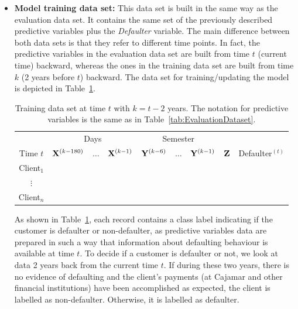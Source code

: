 \begin{itemize}
\item \textbf{Model training data set:}  This data set is built in the same way as the evaluation data set. It contains the same set of the previously described predictive variables plus the \textit{Defaulter} variable. The main difference between both data sets is that they refer to different time points. In fact, the predictive variables in the evaluation data set are built from time $t$ (current time) backward, whereas the ones in the training data set are built from time $k$ (2 years before $t$) backward. The data set for training/updating the model is depicted in Table~\ref{tab:TrainingDataset}.
\begin{table}[h]
\centering
\begin{tabular}{c|ccc|ccc|c|c}
	&\multicolumn{3}{c|}{Days} & \multicolumn{3}{c|}{Semester} & \\
     Time $t$              & $\mathbf{X}^{(k-180)}$ & $\ldots$ & $\mathbf{X}^{(k-1)} $ & $\mathbf{Y}^{(k-6)}$  & $\ldots$ & $\mathbf{Y}^{(k-1)} $ & $\mathbf{Z}$ & Defaulter$^{(t)}$\\  
\hline
Client$_1$  &                                                  &              &                     &                               &                     &        &  \\ 
$\vdots$      &                                                 &               &                     &                                &                     &       & \\ 
Client$_n$  &                                                &               &                     &                                &                     &     & \\ 
\end{tabular} 
\caption{Training data set at time $t$ with $k=t - 2$ years.  The notation for predictive variables is the same as in Table~\ref{tab:EvaluationDataset}.}
\label{tab:TrainingDataset} 
\end{table}

As shown in Table~\ref{tab:TrainingDataset}, each record contains a class label indicating if the customer is defaulter or non-defaulter, as predictive variables data are prepared in such a way that information about defaulting behaviour is available at time $t$. To decide if a customer is defaulter or not, we look at data 2 years back from the current time $t$. If during these two years, there is no evidence of defaulting and the client's payments (at Cajamar and other financial institutions) have been accomplished as expected, the client is labelled as non-defaulter. Otherwise, it is labelled as defaulter.
\end{itemize}


